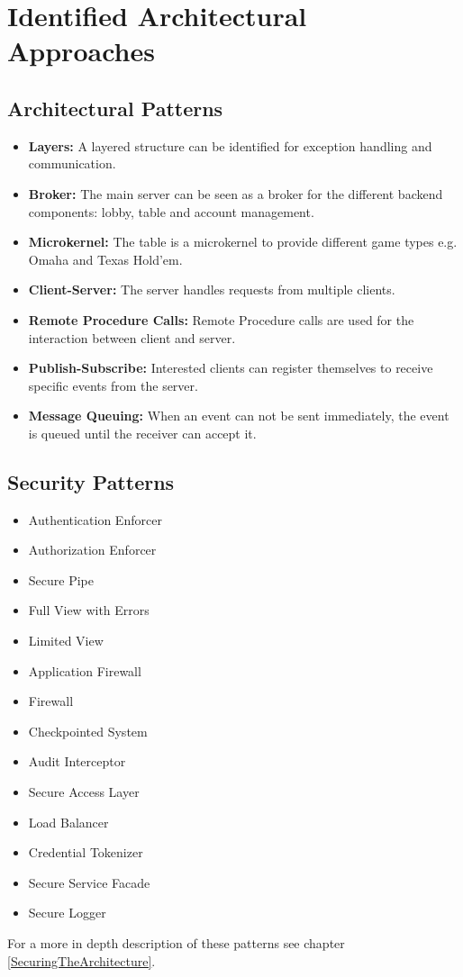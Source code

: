 \documentclass[a4paper,11pt]{report}
\begin{document}
\section{Identified Architectural Approaches}
\subsection{Architectural Patterns}
\begin{itemize}
\item \textbf{Layers:} A layered structure can be identified for exception handling and communication.
\item \textbf{Broker:} The main server can be seen as a broker for the different backend components: lobby, table and account management.
\item \textbf{Microkernel:} The table is a microkernel to provide different game types e.g. Omaha and Texas Hold'em.
\item \textbf{Client-Server:} The server handles requests from multiple clients.
\item \textbf{Remote Procedure Calls:} Remote Procedure calls are used for the interaction between client and server.
\item \textbf{Publish-Subscribe:} Interested clients can register themselves to receive specific events from the server.
\item \textbf{Message Queuing:} When an event can not be sent immediately, the event is queued until the receiver can accept it.
\end{itemize}

\subsection{Security Patterns}
\begin{itemize}
\item Authentication Enforcer
\item Authorization Enforcer
\item Secure Pipe
\item Full View with Errors
\item Limited View
\item Application Firewall
\item Firewall
\item Checkpointed System
\item Audit Interceptor
\item Secure Access Layer
\item Load Balancer
\item Credential Tokenizer
\item Secure Service Facade
\item Secure Logger
\end{itemize}
For a more in depth description of these patterns see chapter \ref{SecuringTheArchitecture}.
\end{document}
